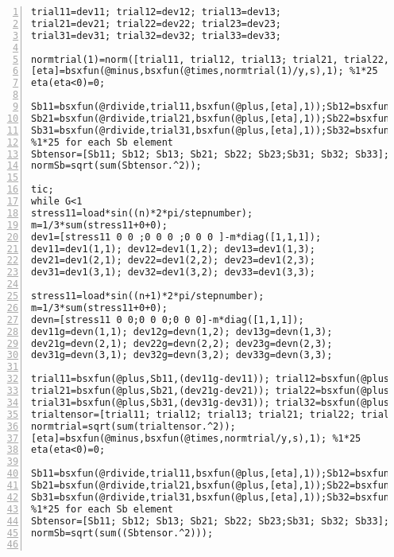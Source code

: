 \begin{lstlisting}[numbers=left, numberstyle=\tiny, keywordstyle=\color{blue!100}, commentstyle=\color{red!30!green!100!blue!100}, frame=shadowbox, rulesepcolor=\color{red!20!green!20!blue!20}]
trial11=dev11; trial12=dev12; trial13=dev13;
trial21=dev21; trial22=dev22; trial23=dev23;
trial31=dev31; trial32=dev32; trial33=dev33;

normtrial(1)=norm([trial11, trial12, trial13; trial21, trial22, trial23;trial31, trial32, trial33],'fro');
[eta]=bsxfun(@minus,bsxfun(@times,normtrial(1)/y,s),1); %1*25
eta(eta<0)=0;

Sb11=bsxfun(@rdivide,trial11,bsxfun(@plus,[eta],1));Sb12=bsxfun(@rdivide,trial12,bsxfun(@plus,[eta],1));Sb13=bsxfun(@rdivide,trial13,bsxfun(@plus,[eta],1));
Sb21=bsxfun(@rdivide,trial21,bsxfun(@plus,[eta],1));Sb22=bsxfun(@rdivide,trial22,bsxfun(@plus,[eta],1));Sb23=bsxfun(@rdivide,trial23,bsxfun(@plus,[eta],1));
Sb31=bsxfun(@rdivide,trial31,bsxfun(@plus,[eta],1));Sb32=bsxfun(@rdivide,trial32,bsxfun(@plus,[eta],1));Sb33=bsxfun(@rdivide,trial33,bsxfun(@plus,[eta],1));
%1*25 for each Sb element
Sbtensor=[Sb11; Sb12; Sb13; Sb21; Sb22; Sb23;Sb31; Sb32; Sb33];
normSb=sqrt(sum(Sbtensor.^2));

tic;
while G<1
stress11=load*sin((n)*2*pi/stepnumber);
m=1/3*sum(stress11+0+0);
dev1=[stress11 0 0 ;0 0 0 ;0 0 0 ]-m*diag([1,1,1]);
dev11=dev1(1,1); dev12=dev1(1,2); dev13=dev1(1,3);
dev21=dev1(2,1); dev22=dev1(2,2); dev23=dev1(2,3);
dev31=dev1(3,1); dev32=dev1(3,2); dev33=dev1(3,3);

stress11=load*sin((n+1)*2*pi/stepnumber);
m=1/3*sum(stress11+0+0);
devn=[stress11 0 0;0 0 0;0 0 0]-m*diag([1,1,1]);
dev11g=devn(1,1); dev12g=devn(1,2); dev13g=devn(1,3);
dev21g=devn(2,1); dev22g=devn(2,2); dev23g=devn(2,3);
dev31g=devn(3,1); dev32g=devn(3,2); dev33g=devn(3,3);

trial11=bsxfun(@plus,Sb11,(dev11g-dev11)); trial12=bsxfun(@plus,Sb12,(dev12g-dev12));trial13=bsxfun(@plus,Sb13,(dev13g-dev13));
trial21=bsxfun(@plus,Sb21,(dev21g-dev21)); trial22=bsxfun(@plus,Sb22,(dev22g-dev22));trial23=bsxfun(@plus,Sb23,(dev23g-dev23));
trial31=bsxfun(@plus,Sb31,(dev31g-dev31)); trial32=bsxfun(@plus,Sb32,(dev32g-dev32));trial33=bsxfun(@plus,Sb33,(dev33g-dev33));
trialtensor=[trial11; trial12; trial13; trial21; trial22; trial23;trial31; trial32; trial33];
normtrial=sqrt(sum(trialtensor.^2));
[eta]=bsxfun(@minus,bsxfun(@times,normtrial/y,s),1); %1*25
eta(eta<0)=0;

Sb11=bsxfun(@rdivide,trial11,bsxfun(@plus,[eta],1));Sb12=bsxfun(@rdivide,trial12,bsxfun(@plus,[eta],1));Sb13=bsxfun(@rdivide,trial13,bsxfun(@plus,[eta],1));
Sb21=bsxfun(@rdivide,trial21,bsxfun(@plus,[eta],1));Sb22=bsxfun(@rdivide,trial22,bsxfun(@plus,[eta],1));Sb23=bsxfun(@rdivide,trial23,bsxfun(@plus,[eta],1));
Sb31=bsxfun(@rdivide,trial31,bsxfun(@plus,[eta],1));Sb32=bsxfun(@rdivide,trial32,bsxfun(@plus,[eta],1));Sb33=bsxfun(@rdivide,trial33,bsxfun(@plus,[eta],1));
%1*25 for each Sb element
Sbtensor=[Sb11; Sb12; Sb13; Sb21; Sb22; Sb23;Sb31; Sb32; Sb33];
normSb=sqrt(sum((Sbtensor.^2)));


\end{lstlisting}
